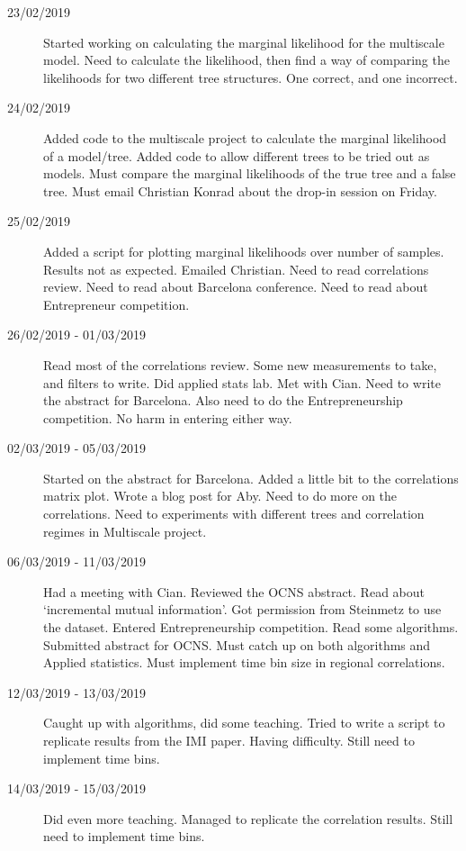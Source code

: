 \documentclass[a4paper,12pt]{article}
\theoremstyle{definition}
\begin{document}
\begin{description}
				\item[23/02/2019] Started working on calculating the marginal likelihood for the multiscale model. Need to calculate the likelihood, then find a way of comparing the likelihoods for two different tree structures. One correct, and one incorrect.

				\item[24/02/2019] Added code to the multiscale project to calculate the marginal likelihood of a model/tree. Added code to allow different trees to be tried out as models. Must compare the marginal likelihoods of the true tree and a false tree. Must email Christian Konrad about the drop-in session on Friday.

				\item[25/02/2019] Added a script for plotting marginal likelihoods over number of samples. Results not as expected. Emailed Christian. Need to read correlations review. Need to read about Barcelona conference. Need to read about Entrepreneur competition.

				\item[26/02/2019 - 01/03/2019] Read most of the correlations review. Some new measurements to take, and filters to write. Did applied stats lab. Met with Cian. Need to write the abstract for Barcelona. Also need to do the Entrepreneurship competition. No harm in entering either way.

				\item[02/03/2019 - 05/03/2019] Started on the abstract for Barcelona. Added a little bit to the correlations matrix plot. Wrote a blog post for Aby. Need to do more on the correlations. Need to experiments with different trees and correlation regimes in Multiscale project.

				\item[06/03/2019 - 11/03/2019] Had a meeting with Cian. Reviewed the OCNS abstract. Read about `incremental mutual information'. Got permission from Steinmetz to use the dataset. Entered Entrepreneurship competition. Read some algorithms. Submitted abstract for OCNS. Must catch up on both algorithms and Applied statistics. Must implement time bin size in regional correlations.

				\item[12/03/2019 - 13/03/2019] Caught up with algorithms, did some teaching. Tried to write a script to replicate results from the IMI paper. Having difficulty. Still need to implement time bins.

				\item[14/03/2019 - 15/03/2019] Did even more teaching. Managed to replicate the correlation results. Still need to implement time bins.


\end{description}
\end{document}
